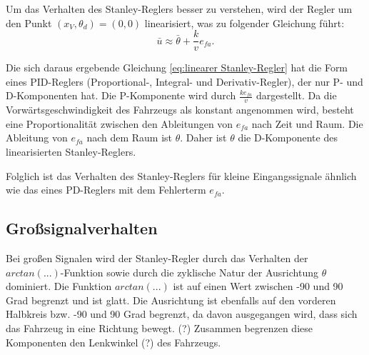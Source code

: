 \documentclass[arbeit=studie,oneside,BCOR=12mm]{ArbeitRST}
\begin{document}
Um das Verhalten des Stanley-Reglers besser zu verstehen, wird der Regler um
den Punkt $\left(x_V, \theta_d\right) = \left(0, 0\right)$
linearisiert, was zu folgender Gleichung führt: 
\begin{equation} \bar{u}
    \approx \bar{\theta} + \frac{k}{v}e_{fa}. 
    \label{eq:linearer Stanley-Regler}
\end{equation}

Die sich daraus ergebende Gleichung \eqref{eq:linearer Stanley-Regler} hat die
Form eines PID-Reglers (Proportional-, Integral- und Derivativ-Regler), der nur
P- und D-Komponenten hat. Die P-Komponente wird durch \(\frac{ke_{fa}}{v}\)
dargestellt. Da die Vorwärtsgeschwindigkeit des Fahrzeugs als konstant
angenommen wird, besteht eine Proportionalität zwischen den Ableitungen von
\(e_{fa}\) nach Zeit und Raum. Die Ableitung von \(e_{fa}\) nach dem Raum ist
\(\theta\). Daher ist \(\theta\) die D-Komponente des linearisierten
Stanley-Reglers.

Folglich ist das Verhalten des Stanley-Reglers für kleine Eingangssignale
ähnlich wie das eines PD-Reglers mit dem Fehlerterm \(e_{fa}\). 


\subsection{Gro{\ss}signalverhalten}

Bei großen Signalen wird der Stanley-Regler durch das Verhalten der
\(arctan(...)\)-Funktion sowie durch die zyklische Natur der Ausrichtung
\(\theta\) dominiert. Die Funktion \(arctan(...)\) ist auf einen Wert zwischen
-90 und 90 Grad begrenzt und ist glatt. Die Ausrichtung ist ebenfalls auf den
vorderen Halbkreis bzw. -90 und 90 Grad begrenzt, da davon ausgegangen wird,
dass sich das Fahrzeug in eine Richtung bewegt. (?) Zusammen begrenzen diese
Komponenten den Lenkwinkel (?) des Fahrzeugs.


\end{document}
